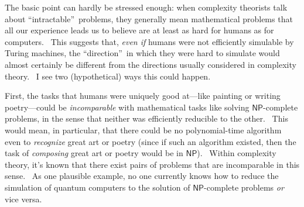 \documentclass[12pt,onecolumn]{article}%
\begin{document}
The basic point can hardly be stressed enough: when complexity theorists talk
about \textquotedblleft intractable\textquotedblright\ problems, they
generally mean mathematical problems that all our experience leads us to
believe are at least as hard for humans as for computers. \ This suggests
that, \textit{even if} humans were not efficiently simulable by Turing
machines, the \textquotedblleft direction\textquotedblright\ in which they
were hard to simulate would almost certainly be different from the directions
usually considered in complexity theory. \ I see two (hypothetical) ways this
could happen.

First, the tasks that humans were uniquely good at---like painting or writing
poetry---could be \textit{incomparable} with mathematical tasks like solving
$\mathsf{NP}$-complete problems, in the sense that neither was efficiently
reducible to the other. \ This would mean, in particular, that there could be
no polynomial-time algorithm even to \textit{recognize} great art or poetry
(since if such an algorithm existed, then the task of \textit{composing} great
art or poetry would be in $\mathsf{NP}$). \ Within complexity theory, it's
known that there exist pairs of problems that are incomparable in this sense.
\ As one plausible example, no one currently knows how to reduce the
simulation of quantum computers to the solution of $\mathsf{NP}$-complete
problems \textit{or} vice versa.
\end{document}
